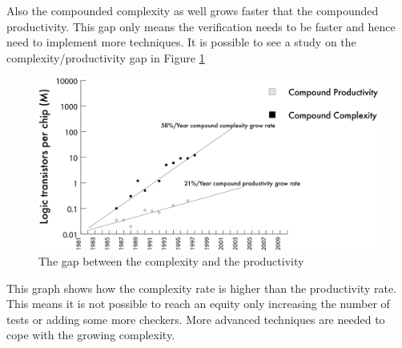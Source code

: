 Also the compounded complexity as well grows faster that the compounded productivity. This gap only means the verification needs to be faster and hence need to implement more techniques.
It is possible to see a study on the complexity/productivity gap in Figure \ref{complexity-gap}
\begin{figure}[H]
    \centering
    \includegraphics[scale = 0.4]{Chapter_1/img/prod-compl.png}
    \caption{The gap between the complexity and the productivity \cite{verification-book-2018}}
    \label{complexity-gap}
\end{figure}

This graph shows how the complexity rate is higher than the productivity rate. This means it is not possible to reach an equity only increasing the number of tests or adding some more checkers. More advanced techniques are needed to cope with the growing complexity.

